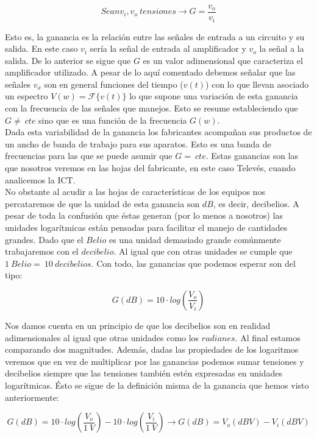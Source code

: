 \documentclass{article}[12 pt]
\begin{document}
			$$Sean v_i, v_o\ tensiones \rightarrow G = \frac{v_o}{v_i}$$

			Esto es, la ganancia es la relación entre las señales de entrada a un circuito y su salida. En este caso $v_i$ sería la señal de entrada al amplificador y $v_o$ la señal a la salida. De lo anterior se sigue que $G$ es un valor adimensional que caracteriza el amplificador utilizado. A pesar de lo aquí comentado debemos señalar que las señales $v_x$ son en general funciones del tiempo ($v(t)$) con lo que llevan asociado un espectro $V(w) = \mathcal{F}\{v(t)\}$ lo que supone una variación de esta ganancia con la frecuencia de las señales que manejos. Esto se resume estableciendo que $G \neq\ cte$ sino que es una función de la frecuencia $G(w)$.\\

			Dada esta variabilidad de la ganancia los fabricantes acompañan sus productos de un ancho de banda de trabajo para sus aparatos. Esto es una banda de frecuencias para las que se puede asumir que $G =\ cte$. Estas ganancias son las que nosotros veremos en las hojas del fabricante, en este caso Televés, cuando analicemos la ICT.\\

			No obstante al acudir a las hojas de características de los equipos nos percataremos de que la unidad de esta ganancia son $dB$, es decir, decibelios. A pesar de toda la confusión que éstas generan (por lo menos a nosotros) las unidades logarítmicas están pensadas para facilitar el manejo de cantidades grandes. Dado que el $Belio$ es una unidad demasiado grande comúnmente trabajaremos con el $decibelio$. Al igual que con otras unidades se cumple que $1\ Belio =\ 10\ decibelios$. Con todo, las ganancias que podemos esperar son del tipo:

			$$G(dB) = 10 \cdot log(\frac{V_o}{V_i})$$

			Nos damos cuenta en un principio de que los decibelios son en realidad adimensionales al igual que otras unidades como los $radianes$. Al final estamos comparando dos magnitudes. Además, dadas las propiedades de los logaritmos veremos que en vez de multiplicar por las ganancias podemos sumar tensiones y decibelios siempre que las tensiones también estén expresadas en unidades logarítmicas. Ésto se sigue de la definición misma de la ganancia que hemos visto anteriormente:

			$$G(dB) = 10 \cdot log(\frac{V_o}{1\ V}) - 10 \cdot log(\frac{V_i}{1\ V}) \rightarrow G(dB) = V_o(dBV) - V_i(dBV)$$
\end{document}
